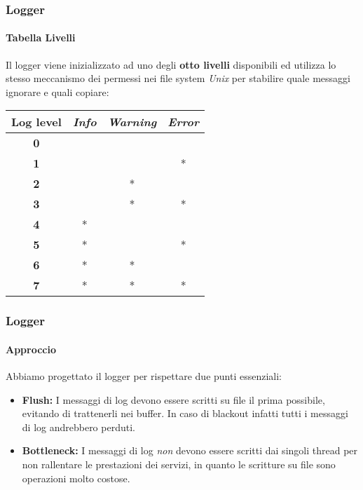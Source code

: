 \documentclass{beamer}
\begin{document}
\begin{frame}
\frametitle{Logger}
\framesubtitle{Tabella Livelli}

Il logger viene
inizializzato ad uno degli \textbf{otto livelli} disponibili ed utilizza lo stesso meccanismo
dei permessi nei file system \textit{Unix} per stabilire quale messaggi ignorare e quali
copiare:



\begin{table}[]
\centering
\label{my-label}
\begin{tabular}{|c|c|c|c|}
\hline
\textbf{Log level} &  \textit{Info} & \textit{Warning} & \textit{Error} \\ \hline
\textbf{0}         &                &                  &                \\ \hline
\textbf{1}         &               &                  & *              \\ \hline
\textbf{2}         &               & *                &                \\ \hline
\textbf{3}         &               & *                & *              \\ \hline
\textbf{4}         & *             &                  &                \\ \hline
\textbf{5}         & *             &                  & *              \\ \hline
\textbf{6}         & *             & *                &                \\ \hline
\textbf{7}         & *             & *                & *              \\ \hline
\end{tabular}
\end{table}
\end{frame}

\begin{frame}
\frametitle{Logger}
\framesubtitle{Approccio}

Abbiamo progettato il logger per rispettare due punti essenziali:

\begin{itemize}
\item \textbf{Flush:} I messaggi di log devono essere scritti su file il prima possibile,
evitando di trattenerli nei buffer. In caso di blackout infatti tutti i
messaggi di log andrebbero perduti.
\item \textbf{Bottleneck:} I messaggi di log \textit{non} devono essere scritti dai singoli thread per
non rallentare le prestazioni dei servizi, in quanto le scritture su
file sono operazioni molto costose.
\end{itemize}

\end{frame}
\end{document}
